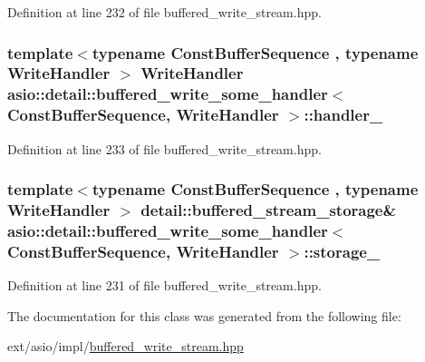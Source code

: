 Definition at line 232 of file buffered\+\_\+write\+\_\+stream.\+hpp.

\hypertarget{classasio_1_1detail_1_1buffered__write__some__handler_a8a01d41c2ea0751dd1ef511c4ceb17e6}{}
\subsubsection[{handler\+\_\+}]{\setlength{\rightskip}{0pt plus 5cm}template$<$typename Const\+Buffer\+Sequence , typename Write\+Handler $>$ Write\+Handler {\bf asio\+::detail\+::buffered\+\_\+write\+\_\+some\+\_\+handler}$<$ Const\+Buffer\+Sequence, Write\+Handler $>$\+::handler\+\_\+}\label{classasio_1_1detail_1_1buffered__write__some__handler_a8a01d41c2ea0751dd1ef511c4ceb17e6}


Definition at line 233 of file buffered\+\_\+write\+\_\+stream.\+hpp.

\hypertarget{classasio_1_1detail_1_1buffered__write__some__handler_a26506a056c3ed5dc287fa2183b4e2174}{}
\subsubsection[{storage\+\_\+}]{\setlength{\rightskip}{0pt plus 5cm}template$<$typename Const\+Buffer\+Sequence , typename Write\+Handler $>$ {\bf detail\+::buffered\+\_\+stream\+\_\+storage}\& {\bf asio\+::detail\+::buffered\+\_\+write\+\_\+some\+\_\+handler}$<$ Const\+Buffer\+Sequence, Write\+Handler $>$\+::storage\+\_\+}\label{classasio_1_1detail_1_1buffered__write__some__handler_a26506a056c3ed5dc287fa2183b4e2174}


Definition at line 231 of file buffered\+\_\+write\+\_\+stream.\+hpp.



The documentation for this class was generated from the following file\+:\begin{DoxyCompactItemize}
\item 
ext/asio/impl/\hyperlink{impl_2buffered__write__stream_8hpp}{buffered\+\_\+write\+\_\+stream.\+hpp}\end{DoxyCompactItemize}
